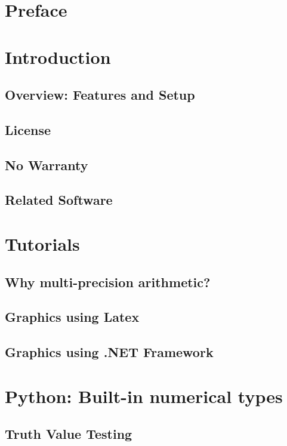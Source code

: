 \documentclass[12pt,a4paper,openany]{book}
\begin{document}
\chapter{Preface}

\chapter{Introduction}

\section{Overview: Features and Setup}

\section{License}

\section{No Warranty}

\section{Related Software}

\chapter{Tutorials}

\section{Why multi-precision arithmetic?}

\section{Graphics using Latex}

\section{Graphics using .NET Framework}

\chapter{Python: Built-in numerical types}

\section{Truth Value Testing}
\end{document}

